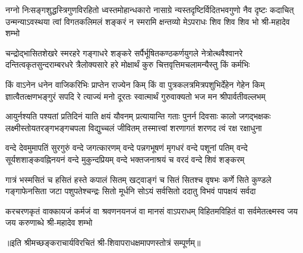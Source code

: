 \fourlineindentedshloka
{नग्नो निःसङ्गशुद्धस्त्रिगुणविरहितो ध्वस्तमोहान्धकारो}
{नासाग्रे न्यस्तदृष्टिर्विदितभवगुणो नैव दृष्टः कदाचित्}
{उन्मन्याऽवस्थया त्वां विगतकलिमलं शङ्करं न स्मरामि}
{क्षन्तव्यो मेऽपराधः शिव शिव शिव भो श्री-महादेव शम्भो} %

\fourlineindentedshloka
{चन्द्रोद्भासितशेखरे स्मरहरे गङ्गाधरे शङ्करे}
{सर्पैर्भूषितकण्ठकर्णयुगले नेत्रोत्थवैश्वानरे}
{दन्तित्वकृतसुन्दराम्बरधरे त्रैलोक्यसारे हरे}
{मोक्षार्थं कुरु चित्तवृत्तिमचलामन्यैस्तु किं कर्मभिः} %


\fourlineindentedshloka
{किं वाऽनेन धनेन वाजिकरिभिः प्राप्तेन राज्येन किम्}
{किं वा पुत्रकलत्रमित्रपशुभिर्देहेन गेहेन किम्}
{ज्ञात्वैतत्क्षणभङ्गुरं सपदि रे त्याज्यं मनो दूरतः}
{स्वात्मार्थं गुरुवाक्यतो भज मन श्रीपार्वतीवल्लभम्} %

\fourlineindentedshloka
{आयुर्नश्यति पश्यतां प्रतिदिनं याति क्षयं यौवनम्}
{प्रत्यायान्ति गताः पुनर्न दिवसाः कालो जगद्भक्षकः}
{लक्ष्मीस्तोयतरङ्गभङ्गचपला विद्युच्चलं जीवितम्}
{तस्मात्त्वां शरणागतं शरणद त्वं रक्ष रक्षाधुना} %


\fourlineindentedshloka
{वन्दे देवमुमापतिं सुरगुरुं वन्दे जगत्कारणम्}
{वन्दे पन्नगभूषणं मृगधरं वन्दे पशूनां पतिम्}
{वन्दे सूर्यशशाङ्कवह्निनयनं वन्दे मुकुन्दप्रियम्}
{वन्दे भक्तजनाश्रयं च वरदं वन्दे शिवं शङ्करम्} %

\fourlineindentedshloka
{गात्रं भस्मसितं च हसितं हस्ते कपालं सितम्}
{खट्वाङ्गं च सितं सितश्च वृषभः कर्णे सिते कुण्डले}
{गङ्गाफेनसिता जटा पशुपतेश्चन्द्रः सितो मूर्धनि}
{सोऽयं सर्वसितो ददातु विभवं पापक्षयं सर्वदा} %

\fourlineindentedshloka
{करचरणकृतं वाक्कायजं कर्मजं वा}
{श्रवणनयनजं वा मानसं वाऽपराधम्}
{विहितमविहितं वा सर्वमेतत्क्ष्मस्व}
{जय जय करुणाब्धे श्री-महादेव शम्भो} %


॥इति श्रीमच्छङ्कराचार्यविरचितं श्री-शिवापराधक्षमापणस्तोत्रं सम्पूर्णम्॥
\setlength{\shlokaspaceskip}{24pt}